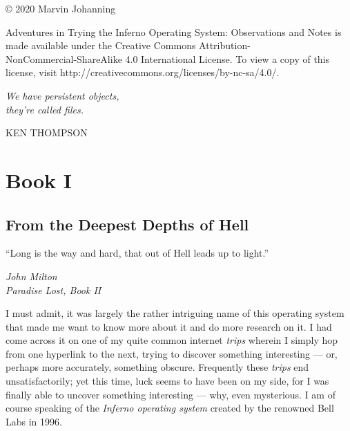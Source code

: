 \documentclass[a4paper,12pt]{report}
\newlength\longest
\begin{document}
\noindent
© 2020 Marvin Johanning

Adventures in Trying the Inferno Operating System: Observations and Notes is made available under the Creative Commons Attribution-\\NonCommercial-ShareAlike 4.0 International License. To view a copy of this license, visit http://creativecommons.org/licenses/by-nc-sa/4.0/.

\clearpage
\thispagestyle{empty}
\null\vfill
\settowidth{}
\begin{center}
\parbox{\longest}{%
  \raggedright{\huge\itshape%
    We have persistent objects, \\they're called files. \par\bigskip
  }
  \raggedleft\Large\MakeUppercase{Ken Thompson}\par%
}
\vfill\vfill
\clearpage\newpage
\end{center}


\thispagestyle{empty}
  \mbox{}
  \newpage


\part*{Book I}
  \newpage

\thispagestyle{empty}
  \mbox{}
  \newpage

\chapter*{From the Deepest Depths of Hell}

\epigraph{``Long is the way and hard, that out of Hell leads up to light.''}{\textit{John Milton\\Paradise Lost, Book II}}

I must admit, it was largely the rather intriguing name of this operating system that made me want to know more about it and do more research on it. I had come across it on one of my quite common internet \textit{trips} wherein I simply hop from one hyperlink to the next, trying to discover something interesting — or, perhaps more accurately, something obscure. 
Frequently these \textit{trips} end unsatisfactorily; yet this time, luck seems to have been on my side, for I was finally able to uncover something interesting — why, even mysterious. I am of course speaking of the \textit{Inferno operating system} created by the renowned Bell Labs in 1996. 
\end{document}
